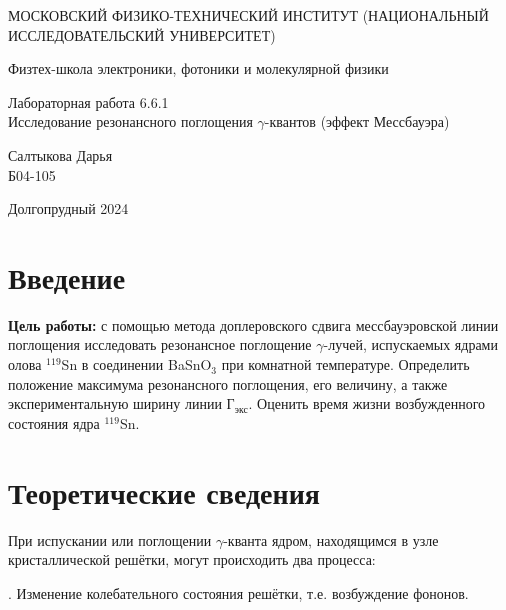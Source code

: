 \documentclass[a4paper,12pt]{article} %
\begin{document}
	
	\begin{titlepage}
	\begin{center}
		{\large МОСКОВСКИЙ ФИЗИКО-ТЕХНИЧЕСКИЙ ИНСТИТУТ (НАЦИОНАЛЬНЫЙ ИССЛЕДОВАТЕЛЬСКИЙ УНИВЕРСИТЕТ)}
	\end{center}
	\begin{center}
		{\large Физтех-школа электроники, фотоники и молекулярной физики}
	\end{center}
	
	
	\vspace{4.5cm}
	{\huge
		\begin{center}
			{Лабораторная работа 6.6.1}\\
			Исследование резонансного поглощения $\gamma$-квантов (эффект Мессбауэра)
		\end{center}
	}
	\vspace{2cm}
	\begin{flushright}
		{\LARGE Салтыкова Дарья \\
			\vspace{0.5cm}
			Б04-105}
	\end{flushright}
	\vspace{8cm}
	\begin{center}
		Долгопрудный 2024
	\end{center}
\end{titlepage}

\section{Введение}

\noindent \textbf{Цель работы:} с помощью метода доплеровского сдвига мессбауэровской линии поглощения исследовать резонансное поглощение $\gamma$-лучей, испускаемых ядрами олова $^{119}$Sn в соединении BaSnO$_3$ при комнатной температуре. Определить положение максимума резонансного поглощения, его величину, а также экспериментальную ширину линии Г$_\text{экс}$. Оценить время жизни возбужденного состояния ядра $^{119}$Sn.

\medskip
	 

\section{Теоретические сведения}
\noindent При испускании или поглощении $\gamma$-кванта ядром, находящимся в узле кристаллической решётки, могут происходить два процесса:


. Изменение колебательного состояния решётки, т.е. возбуждение фононов.
\end{document}
